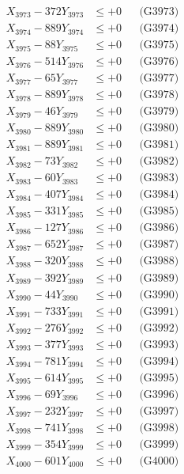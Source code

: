 \documentclass[a4paper,10pt]{article}
\begin{document}
{\begin{align}
X_{3973} - 372Y_{3973} &\leq +0 && \text{(G3973)} \\
X_{3974} - 889Y_{3974} &\leq +0 && \text{(G3974)} \\
X_{3975} - 88Y_{3975} &\leq +0 && \text{(G3975)} \\
X_{3976} - 514Y_{3976} &\leq +0 && \text{(G3976)} \\
X_{3977} - 65Y_{3977} &\leq +0 && \text{(G3977)} \\
X_{3978} - 889Y_{3978} &\leq +0 && \text{(G3978)} \\
X_{3979} - 46Y_{3979} &\leq +0 && \text{(G3979)} \\
X_{3980} - 889Y_{3980} &\leq +0 && \text{(G3980)} \\
\allowbreak
X_{3981} - 889Y_{3981} &\leq +0 && \text{(G3981)} \\
X_{3982} - 73Y_{3982} &\leq +0 && \text{(G3982)} \\
X_{3983} - 60Y_{3983} &\leq +0 && \text{(G3983)} \\
X_{3984} - 407Y_{3984} &\leq +0 && \text{(G3984)} \\
X_{3985} - 331Y_{3985} &\leq +0 && \text{(G3985)} \\
X_{3986} - 127Y_{3986} &\leq +0 && \text{(G3986)} \\
X_{3987} - 652Y_{3987} &\leq +0 && \text{(G3987)} \\
X_{3988} - 320Y_{3988} &\leq +0 && \text{(G3988)} \\
X_{3989} - 392Y_{3989} &\leq +0 && \text{(G3989)} \\
X_{3990} - 44Y_{3990} &\leq +0 && \text{(G3990)} \\
\allowbreak
X_{3991} - 733Y_{3991} &\leq +0 && \text{(G3991)} \\
X_{3992} - 276Y_{3992} &\leq +0 && \text{(G3992)} \\
X_{3993} - 377Y_{3993} &\leq +0 && \text{(G3993)} \\
X_{3994} - 781Y_{3994} &\leq +0 && \text{(G3994)} \\
X_{3995} - 614Y_{3995} &\leq +0 && \text{(G3995)} \\
X_{3996} - 69Y_{3996} &\leq +0 && \text{(G3996)} \\
X_{3997} - 232Y_{3997} &\leq +0 && \text{(G3997)} \\
X_{3998} - 741Y_{3998} &\leq +0 && \text{(G3998)} \\
X_{3999} - 354Y_{3999} &\leq +0 && \text{(G3999)} \\
X_{4000} - 601Y_{4000} &\leq +0 && \text{(G4000)} \\

\end{align}}
\end{document}
